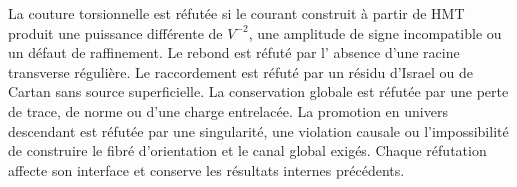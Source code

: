 \begin{falsifierbox}
La couture torsionnelle est réfutée si le courant construit à partir de HMT
produit une puissance différente de \(V^{-2}\), une amplitude de signe
incompatible ou un défaut de raffinement. Le rebond est réfuté par l'
absence d'une racine transverse régulière. Le raccordement est réfuté par un
résidu d'Israel ou de Cartan sans source superficielle. La conservation globale
est réfutée par une perte de trace, de norme ou d'une charge entrelacée.
La promotion en univers descendant est réfutée par une singularité,
une violation causale ou l'impossibilité de construire le fibré d'orientation et le
canal global exigés. Chaque réfutation affecte son interface et conserve les
résultats internes précédents.
\end{falsifierbox}
